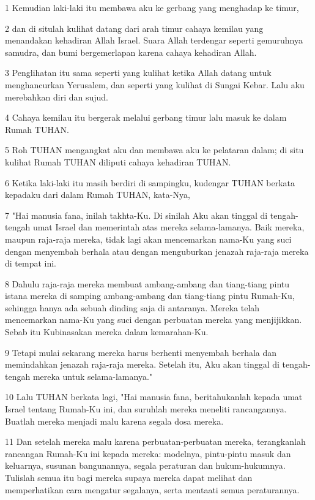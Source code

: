 \par 1 Kemudian laki-laki itu membawa aku ke gerbang yang menghadap ke timur,
\par 2 dan di situlah kulihat datang dari arah timur cahaya kemilau yang menandakan kehadiran Allah Israel. Suara Allah terdengar seperti gemuruhnya samudra, dan bumi bergemerlapan karena cahaya kehadiran Allah.
\par 3 Penglihatan itu sama seperti yang kulihat ketika Allah datang untuk menghancurkan Yerusalem, dan seperti yang kulihat di Sungai Kebar. Lalu aku merebahkan diri dan sujud.
\par 4 Cahaya kemilau itu bergerak melalui gerbang timur lalu masuk ke dalam Rumah TUHAN.
\par 5 Roh TUHAN mengangkat aku dan membawa aku ke pelataran dalam; di situ kulihat Rumah TUHAN diliputi cahaya kehadiran TUHAN.
\par 6 Ketika laki-laki itu masih berdiri di sampingku, kudengar TUHAN berkata kepadaku dari dalam Rumah TUHAN, kata-Nya,
\par 7 "Hai manusia fana, inilah takhta-Ku. Di sinilah Aku akan tinggal di tengah-tengah umat Israel dan memerintah atas mereka selama-lamanya. Baik mereka, maupun raja-raja mereka, tidak lagi akan mencemarkan nama-Ku yang suci dengan menyembah berhala atau dengan menguburkan jenazah raja-raja mereka di tempat ini.
\par 8 Dahulu raja-raja mereka membuat ambang-ambang dan tiang-tiang pintu istana mereka di samping ambang-ambang dan tiang-tiang pintu Rumah-Ku, sehingga hanya ada sebuah dinding saja di antaranya. Mereka telah mencemarkan nama-Ku yang suci dengan perbuatan mereka yang menjijikkan. Sebab itu Kubinasakan mereka dalam kemarahan-Ku.
\par 9 Tetapi mulai sekarang mereka harus berhenti menyembah berhala dan memindahkan jenazah raja-raja mereka. Setelah itu, Aku akan tinggal di tengah-tengah mereka untuk selama-lamanya."
\par 10 Lalu TUHAN berkata lagi, "Hai manusia fana, beritahukanlah kepada umat Israel tentang Rumah-Ku ini, dan suruhlah mereka meneliti rancangannya. Buatlah mereka menjadi malu karena segala dosa mereka.
\par 11 Dan setelah mereka malu karena perbuatan-perbuatan mereka, terangkanlah rancangan Rumah-Ku ini kepada mereka: modelnya, pintu-pintu masuk dan keluarnya, susunan bangunannya, segala peraturan dan hukum-hukumnya. Tulislah semua itu bagi mereka supaya mereka dapat melihat dan memperhatikan cara mengatur segalanya, serta mentaati semua peraturannya.
